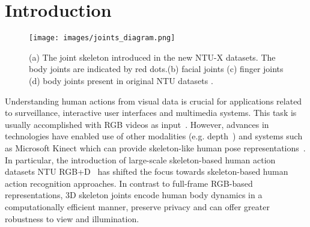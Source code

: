 \documentclass[sigconf,screen,prologue,table,dvipsnames]{acmart}
\begin{document}




\maketitle

\section{Introduction}
\label{sec:intro}

\begin{figure}[]
    \centering
    \texttt{[image: images/joints\_diagram.png]}
    \caption{(a) The  joint skeleton introduced in the new NTU-X datasets. The  body joints are indicated by red dots.(b)  facial joints (c)  finger joints (d)  body joints present in original NTU datasets .  }
    \label{fig:joints_fig}
\end{figure}

Understanding human actions from visual data is crucial for applications related to surveillance, interactive user interfaces and multimedia systems. This task is usually accomplished with RGB videos as input~\cite{Poppe_IV_2010}. However, advances in technologies have enabled use of other modalities (e.g. depth~\cite{wang2012mining}) and systems such as Microsoft Kinect which can provide skeleton-like human pose representations~\cite{ren2020survey}. In particular, the introduction of large-scale skeleton-based human action datasets NTU RGB+D~\cite{Shahroudy_2016_CVPR,Liu_2019_NTURGBD120} has shifted the focus towards skeleton-based human action recognition approaches. In contrast to full-frame RGB-based representations, 3D skeleton joints encode human body dynamics in a computationally efficient manner, preserve privacy and can offer greater robustness to view and illumination.
\end{document}
